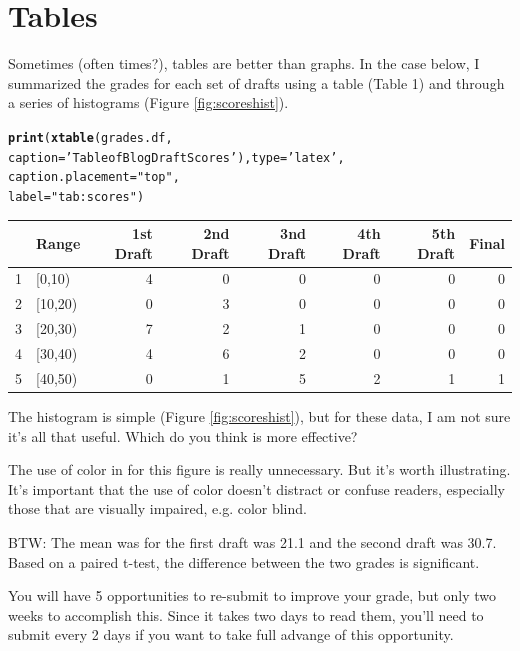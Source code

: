 \documentclass{article}\usepackage[]{graphicx}\usepackage[]{color}
\makeatletter
\newcommand{\hlstr}[1]{\textcolor[rgb]{0.192,0.494,0.8}{#1}}%
\newcommand{\hlstd}[1]{\textcolor[rgb]{0.345,0.345,0.345}{#1}}%
\newcommand{\hlkwc}[1]{\textcolor[rgb]{0.333,0.667,0.333}{#1}}%
\newcommand{\hlkwd}[1]{\textcolor[rgb]{0.737,0.353,0.396}{\textbf{#1}}}%
\newenvironment{kframe}{%
 \def\at@end@of@kframe{}%
 \ifinner\ifhmode%
  \def\at@end@of@kframe{\end{minipage}}%
  \begin{minipage}{\columnwidth}%
 \fi\fi%
 \def\FrameCommand##1{\hskip\@totalleftmargin \hskip-\fboxsep
 \colorbox{shadecolor}{##1}\hskip-\fboxsep
     \hskip-\linewidth \hskip-\@totalleftmargin \hskip\columnwidth}%
 \MakeFramed {\advance\hsize-\width
   \@totalleftmargin\z@ \linewidth\hsize
   \@setminipage}}%
 {\par\unskip\endMakeFramed%
 \at@end@of@kframe}
\makeatother
\begin{document}
\section{Tables}

Sometimes (often times?), tables are better than graphs. In the case below, I summarized the grades for each set of drafts using a table (Table 1) and through a series of histograms (Figure \ref{fig:scoreshist}). 




\begin{kframe}
\begin{alltt}
\hlkwd{print}\hlstd{(}\hlkwd{xtable}\hlstd{(grades.df,}
      \hlkwc{caption}\hlstd{=}\hlstr{'Table of Blog Draft Scores'}\hlstd{),} \hlkwc{type}\hlstd{=}\hlstr{'latex'}\hlstd{,}
      \hlkwc{caption.placement} \hlstd{=} \hlstr{"top"}\hlstd{,}
      \hlkwc{label}\hlstd{=}\hlstr{"tab:scores"}\hlstd{)}
\end{alltt}
\end{kframe}%
% 
\begin{tabular}{rlrrrrrr}
  \hline
 & Range & 1st Draft & 2nd Draft & 3nd Draft & 4th Draft & 5th Draft & Final \\ 
  \hline
1 & [0,10) &   4 &   0 &   0 &   0 &   0 &   0 \\ 
  2 & [10,20) &   0 &   3 &   0 &   0 &   0 &   0 \\ 
  3 & [20,30) &   7 &   2 &   1 &   0 &   0 &   0 \\ 
  4 & [30,40) &   4 &   6 &   2 &   0 &   0 &   0 \\ 
  5 & [40,50) &   0 &   1 &   5 &   2 &   1 &   1 \\ 
   \hline
\end{tabular}


\bigskip

The histogram is simple (Figure \ref{fig:scoreshist}), but for these data, I am not sure it's all that useful. Which do you think is more effective? 

The use of color in for this figure is really unnecessary. But it's worth illustrating. It's important that the use of color doesn't distract or confuse readers, especially those that are visually impaired, e.g. color blind.

\bigskip
BTW: The mean was for the first draft was 21.1 and the second draft was 30.7. Based on a paired t-test, the difference between the two grades is significant. 

You will have 5 opportunities to re-submit to improve your grade, but only two weeks to accomplish this. Since it takes two days to read them, you'll need to submit every 2 days if you want to take full advange of this opportunity. 
\end{document}
